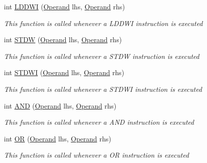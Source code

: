 \begin{DoxyCompactItemize}
int \hyperlink{class_c_p_u___o_s___simulator_1_1_c_p_u_1_1_instruction_a2f70d186e9e857881d9dfaf7c4e2cfa8}{L\+D\+D\+W\+I} (\hyperlink{class_c_p_u___o_s___simulator_1_1_c_p_u_1_1_operand}{Operand} lhs, \hyperlink{class_c_p_u___o_s___simulator_1_1_c_p_u_1_1_operand}{Operand} rhs)
\begin{DoxyCompactList}\small\item\em This function is called whenever a L\+D\+D\+W\+I instruction is executed \end{DoxyCompactList}\item 
int \hyperlink{class_c_p_u___o_s___simulator_1_1_c_p_u_1_1_instruction_ac1213c1f15be4bd4a28cdee4beb07df7}{S\+T\+D\+W} (\hyperlink{class_c_p_u___o_s___simulator_1_1_c_p_u_1_1_operand}{Operand} lhs, \hyperlink{class_c_p_u___o_s___simulator_1_1_c_p_u_1_1_operand}{Operand} rhs)
\begin{DoxyCompactList}\small\item\em This function is called whenever a S\+T\+D\+W instruction is executed \end{DoxyCompactList}\item 
int \hyperlink{class_c_p_u___o_s___simulator_1_1_c_p_u_1_1_instruction_a33e57864c33400a06aca3c059286a66c}{S\+T\+D\+W\+I} (\hyperlink{class_c_p_u___o_s___simulator_1_1_c_p_u_1_1_operand}{Operand} lhs, \hyperlink{class_c_p_u___o_s___simulator_1_1_c_p_u_1_1_operand}{Operand} rhs)
\begin{DoxyCompactList}\small\item\em This function is called whenever a S\+T\+D\+W\+I instruction is executed \end{DoxyCompactList}\item 
int \hyperlink{class_c_p_u___o_s___simulator_1_1_c_p_u_1_1_instruction_a4b5e469acee3a32016220af620b98650}{A\+N\+D} (\hyperlink{class_c_p_u___o_s___simulator_1_1_c_p_u_1_1_operand}{Operand} lhs, \hyperlink{class_c_p_u___o_s___simulator_1_1_c_p_u_1_1_operand}{Operand} rhs)
\begin{DoxyCompactList}\small\item\em This function is called whenever a A\+N\+D instruction is executed \end{DoxyCompactList}\item 
int \hyperlink{class_c_p_u___o_s___simulator_1_1_c_p_u_1_1_instruction_a32adcd85bab5adfeeb4effa90275dee5}{O\+R} (\hyperlink{class_c_p_u___o_s___simulator_1_1_c_p_u_1_1_operand}{Operand} lhs, \hyperlink{class_c_p_u___o_s___simulator_1_1_c_p_u_1_1_operand}{Operand} rhs)
\begin{DoxyCompactList}\small\item\em This function is called whenever a O\+R instruction is executed \end{DoxyCompactList}\item 

\end{DoxyCompactItemize}
